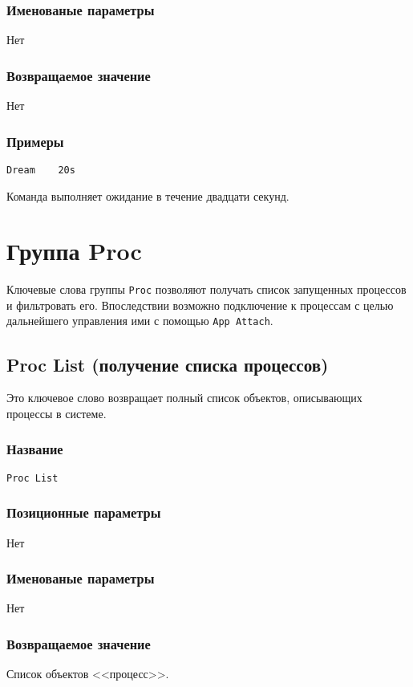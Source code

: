 \documentclass[11pt]{book} %
\begin{document}
\subsubsection*{Именованые параметры} 
Нет

\subsubsection*{Возвращаемое значение} 
Нет

\subsubsection*{Примеры}
\begin{verbatim}Dream    20s\end{verbatim}

Команда выполняет ожидание в течение двадцати секунд.




\section{Группа Proc}
Ключевые слова группы \verb"Proc" позволяют получать список запущенных процессов и фильтровать его. Впоследствии возможно подключение к процессам с целью дальнейшего управления ими с помощью \verb"App Attach".

\subsection{Proc List (получение списка процессов)}
Это ключевое слово возвращает полный список объектов, описывающих процессы в системе.


\subsubsection*{Название} 
\verb"Proc List"

\subsubsection*{Позиционные параметры} 
Нет

\subsubsection*{Именованые параметры} 
Нет


\subsubsection*{Возвращаемое значение} 
Список объектов <<процесс>>.
\end{document}
